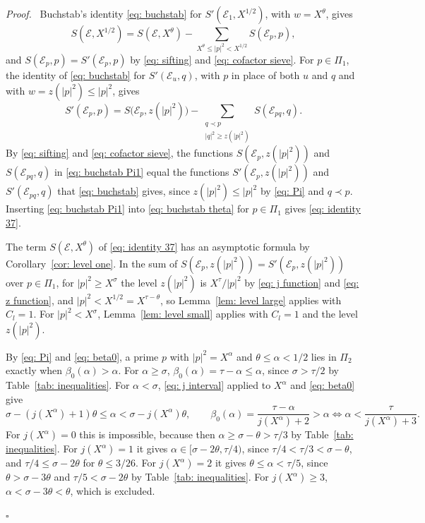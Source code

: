 \documentclass{article}
\numberwithin{equation}{section}
\newenvironment{proof}[1][Proof]{\par\medskip\noindent\textit{#1.}\ }{\hfill$\square$\par\medskip}
\newcommand{\Le}{\leqslant}
\newcommand{\Ge}{\geqslant}
\begin{document}
\begin{proof}
Buchstab's identity \eqref{eq: buchstab} for $S'(\mathcal{E}_1, X^{1/2})$, with $w = X^{\theta}$, gives
\begin{equation}
\label{eq: buchstab theta}
S(\mathcal{E}, X^{1/2}) = S(\mathcal{E}, X^{\theta}) - \sum_{X^{\theta} \Le |p|^2 < X^{1/2}} S(\mathcal{E}_p, p),
\end{equation}
and $S(\mathcal{E}_p, p) = S'(\mathcal{E}_p, p)$ by \eqref{eq: sifting} and \eqref{eq: cofactor sieve}. For $p \in \Pi_1$, the identity of \eqref{eq: buchstab} for $S'(\mathcal{E}_u, q)$, with $p$ in place of both $u$ and $q$ and with $w = z(|p|^2) \Le |p|^2$, gives
\begin{equation}
\label{eq: buchstab Pi1}
S'(\mathcal{E}_p, p) = S\bigl(\mathcal{E}_p, z(|p|^2)\bigr) - \sum_{\substack{q \prec p \\ |q|^2 \Ge z(|p|^2)}} S(\mathcal{E}_{pq}, q).
\end{equation}
By \eqref{eq: sifting} and \eqref{eq: cofactor sieve}, the functions $S(\mathcal{E}_p, z(|p|^2))$ and $S(\mathcal{E}_{pq}, q)$ in \eqref{eq: buchstab Pi1} equal the functions $S'(\mathcal{E}_p, z(|p|^2))$ and $S'(\mathcal{E}_{pq}, q)$ that \eqref{eq: buchstab} gives, since $z(|p|^2) \Le |p|^2$ by \eqref{eq: Pi} and $q \prec p$. Inserting \eqref{eq: buchstab Pi1} into \eqref{eq: buchstab theta} for $p \in \Pi_1$ gives \eqref{eq: identity 37}.

The term $S(\mathcal{E}, X^{\theta})$ of \eqref{eq: identity 37} has an asymptotic formula by Corollary~\ref{cor: level one}. In the sum of $S(\mathcal{E}_p, z(|p|^2)) = S'(\mathcal{E}_p, z(|p|^2))$ over $p \in \Pi_1$, for $|p|^2 \Ge X^{\sigma}$ the level $z(|p|^2)$ is $X^{\tau}/|p|^2$ by \eqref{eq: j function} and \eqref{eq: z function}, and $|p|^2 < X^{1/2} = X^{\tau - \theta}$, so Lemma~\ref{lem: level large} applies with $C_l = 1$. For $|p|^2 < X^{\sigma}$, Lemma~\ref{lem: level small} applies with $C_l = 1$ and the level $z(|p|^2)$.

By \eqref{eq: Pi} and \eqref{eq: beta0}, a prime $p$ with $|p|^2 = X^{\alpha}$ and $\theta \Le \alpha < 1/2$ lies in $\Pi_2$ exactly when $\beta_0(\alpha) > \alpha$. For $\alpha \Ge \sigma$, $\beta_0(\alpha) = \tau - \alpha \Le \alpha$, since $\sigma > \tau/2$ by Table~\ref{tab: inequalities}. For $\alpha < \sigma$, \eqref{eq: j interval} applied to $X^{\alpha}$ and \eqref{eq: beta0} give
\begin{equation*}
\sigma - (j(X^{\alpha}) + 1)\theta \Le \alpha < \sigma - j(X^{\alpha})\theta, \qquad \beta_0(\alpha) = \frac{\tau - \alpha}{j(X^{\alpha}) + 2} > \alpha \iff \alpha < \frac{\tau}{j(X^{\alpha}) + 3}.
\end{equation*}
For $j(X^{\alpha}) = 0$ this is impossible, because then $\alpha \Ge \sigma - \theta > \tau/3$ by Table~\ref{tab: inequalities}. For $j(X^{\alpha}) = 1$ it gives $\alpha \in [\sigma - 2\theta, \tau/4)$, since $\tau/4 < \tau/3 < \sigma - \theta$, and $\tau/4 \Le \sigma - 2\theta$ for $\theta \Le 3/26$. For $j(X^{\alpha}) = 2$ it gives $\theta \Le \alpha < \tau/5$, since $\theta > \sigma - 3\theta$ and $\tau/5 < \sigma - 2\theta$ by Table~\ref{tab: inequalities}. For $j(X^{\alpha}) \Ge 3$, $\alpha < \sigma - 3\theta < \theta$, which is excluded.


\end{proof}
\end{document}
